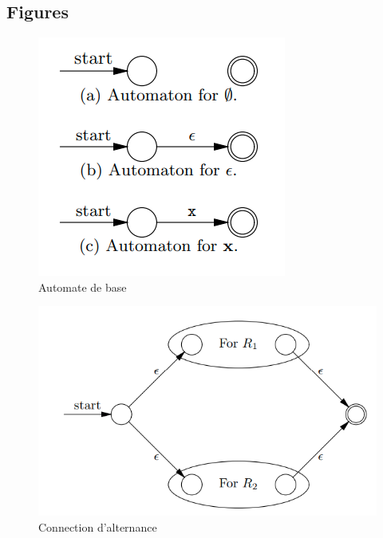 \documentclass[14px]{article}
\begin{document}
\subsection{Figures}
\begin{figure}[H]
	\begin{minipage}[H]{0.3\linewidth}
		\centering
		\includegraphics[width=\textwidth]{AutomateBase.png}\\
		\caption{Automate de base}
		\label{img1}
	\end{minipage}
	\begin{minipage}[H]{0.4\linewidth}
		\centering
		\includegraphics[width=\textwidth]{Connection1.png}
		\caption{Connection d'alternance}
		\label{img2}
	\end{minipage}
\end{figure}
\end{document}
